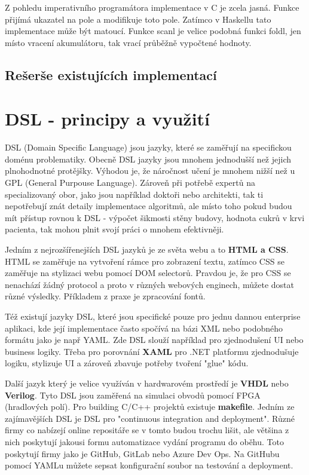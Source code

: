 \documentclass[male,czech]{kithesis}
\begin{document}
Z pohledu imperativního programátora implementace v C je zcela jasná. Funkce přijímá ukazatel na
pole a modifikuje toto pole. Zatímco v Haskellu tato implementace může být matoucí. Funkce scanl je 
velice podobná funkci foldl, jen místo vracení akumulátoru, tak vrací průběžně vypočtené hodnoty.

\section{Rešerše existujících implementací}

\chapter{DSL - principy a využití}
DSL (Domain Specific Language) jsou jazyky, které se zaměřují na specifickou doménu problematiky.
Obecně DSL jazyky jsou mnohem jednodušší než jejich plnohodnotné protějšky. Výhodou je, že 
náročnost učení je mnohem nižší než u GPL (General Purpouse Language). Zároveň při potřebě 
expertů na specializovaný obor, jako jsou například doktoři nebo architekti, tak ti nepotřebují znát detaily 
implementace algoritmů, ale místo toho pokud budou mít přístup rovnou k DSL - výpočet šikmosti stěny budovy,
hodnota cukrů v krvi pacienta, tak mohou plnit svojí práci o mnohem efektivněji. \cite{DomainSpecificLanguages}

Jedním z nejrozšířenejších DSL jazyků je ze světa webu a to \textbf{HTML a CSS}. HTML se zaměřuje na vytvoření rámce pro zobrazení textu,
zatímco CSS se zaměřuje na stylizaci webu pomocí DOM selectorů. Pravdou je, že pro CSS se nenachází žádný 
protocol a proto v různých webových enginech, můžete dostat různé výsledky. Příkladem z praxe je zpracování
fontů.

Též existují jazyky DSL, které jsou specifické pouze pro jednu dannou enterprise aplikaci, kde její implementace
často spočívá na bázi XML nebo podobného formátu jako je např YAML. Zde DSL slouží například pro 
zjednodušení UI nebo business logiky. Třeba pro porovnání \textbf{XAML} pro .NET platformu zjednodušuje logiku, 
stylizuje UI a zároveň zbavuje potřeby tvoření "glue" kódu.

Další jazyk který je velice využíván v hardwarovém prostředí je \textbf{VHDL} nebo \textbf{Verilog}. Tyto DSL jsou zaměřená
na simulaci obvodů pomocí FPGA (hradlových polí). Pro building C/C++ projektů existuje \textbf{makefile}. Jedním ze zajímavějších
DSL je DSL pro "continuous integration and deployment". Různé firmy co nabízejí online repositáře se v tomto budou trochu lišit, ale
většina z nich poskytují jakousi formu automatizace vydání programu do oběhu. Toto poskytují firmy jako je GitHub,
GitLab nebo Azure Dev Ops. Na GitHubu pomocí YAMLu můžete sepsat konfigurační soubor na testování a deployment.
\end{document}
